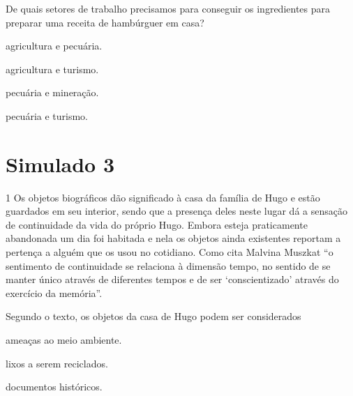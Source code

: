 \begin{itemize}
\begin{itemize}
\begin{itemize}
\begin{itemize}
{{\begin{itemize}
\begin{itemize}
De quais setores de trabalho precisamos para conseguir os ingredientes
para preparar uma receita de hambúrguer em casa?

\begin{escolha}
\item agricultura e pecuária.

\item agricultura e turismo.

\item pecuária e mineração.

\item pecuária e turismo.
\end{escolha}


\chapter{Simulado 3}

\num{1} Os objetos biográficos dão significado à casa da família de Hugo e
estão guardados em seu interior, sendo que a presença deles neste lugar
dá a sensação de continuidade da vida do próprio Hugo. Embora esteja
praticamente abandonada um dia foi habitada e nela os objetos ainda
existentes reportam a pertença a alguém que os usou no cotidiano. Como
cita Malvina Muszkat ``o sentimento de continuidade se relaciona à
dimensão tempo, no sentido de se manter único através de diferentes
tempos e de ser `conscientizado' através do exercício da memória''.


Segundo o texto, os objetos da casa de Hugo podem ser considerados

\begin{escolha}
\item ameaças ao meio ambiente.

\item lixos a serem reciclados.

\item documentos históricos.


\end{escolha}
\end{itemize}
\end{itemize}}}
\end{itemize}
\end{itemize}
\end{itemize}
\end{itemize}
